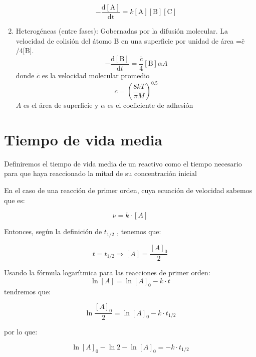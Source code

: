 \begin{enumerate}

 \begin{equation*} -\frac{\mathrm{d}[\textrm{A}]}{\mathrm{d}t}=k[\textrm{A}][\textrm{B}][\textrm{C}]
 \end{equation*}
 
 \item Heterog\'eneas (entre fases): Gobernadas por la difusi\'on molecular. La velocidad de colisi\'on del \'atomo B en una superficie por unidad de \'area =$\bar{c}$/4[B]. 
\begin{equation*}
-\frac{\mathrm{d}[\textrm{B}]}{\mathrm{d}t}=\frac{\bar{c}}{4}[\textrm{B}]\alpha A
\end{equation*}
 donde $\bar{c}$ es la velocidad molecular promedio \begin{equation}
\bar{c}=\left(\frac{8kT}{\pi M}\right)^{0.5}
\end{equation}
$A$ es el \'area de superficie y $\alpha$ es el coeficiente de adhesi\'on
\end{enumerate}

\section{Tiempo de vida media}
Definiremos el tiempo de vida media de un reactivo como el tiempo necesario para que haya reaccionado la mitad de su concentración inicial

En el caso de una reacción de primer orden, cuya ecuación de velocidad sabemos que es: 

\begin{equation*}
\nu =k\cdot [A]
\end{equation*}

Entonces, según la definición de  $t_{1/2}$ , tenemos que:

\begin{equation*}
t=t_{1/2} \Longrightarrow  [A]=\frac{[A]_0}{2}
\end{equation*}

Usando la fórmula logarítmica para las reacciones de primer orden:
\begin{equation*}
\ln[A]=\ln[A]_0-k\cdot t
\end{equation*}
tendremos que: 

$$\ln\frac{[A]_0}{2}=\ln[A]_0-k\cdot t_{1/2}$$

por lo que:

$$\ln[A]_0-\ln2-\ln[A]_0=-k\cdot t_{1/2}$$

